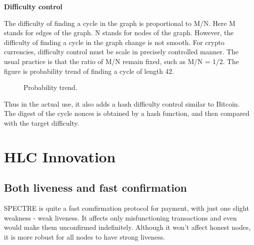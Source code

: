 \documentclass[a4paper,11pt]{article}
\begin{document}
\textbf{Difficulty control}

The difficulty of finding a cycle in the graph is proportional to M/N. Here M stands for edges of the graph.
N stands for nodes of the graph. However, the difficulty of finding a cycle in the graph change is not smooth.
For crypto currencies, difficulty control must be scale in precisely controlled manner. The usual practice is
that the ratio of M/N remain fixed, such as M/N = 1/2.
The figure is probability trend of finding a cycle of length 42.

\begin{figure}[h]
	\centerline{%
	}
	\caption{Probability trend.}
\end{figure}

Thus in the actual use, it also adds a hash difficulty control similar to Bitcoin. The digest of the cycle nonces is obtained by a hash function,
and then compared with the target difficulty.

\section{HLC Innovation}
\subsection{Both liveness and fast confirmation} 
SPECTRE is quite a fast comfirmation protocol for payment, with just one slight weakness - weak liveness. It affects only misfunctioning transactions and even would make them unconfirmed indefinitely. Although it won't affect honest nodes, it is more robust for all nodes to have strong liveness.
\end{document}
